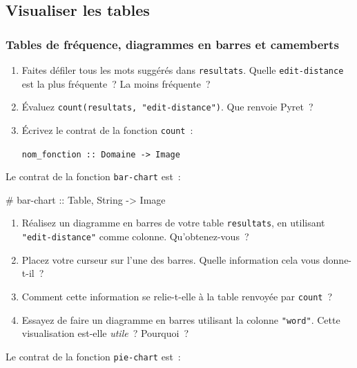 \documentclass[12pt,a4paper]{article}
\newcommand{\contrat}[1]{%
  \begin{contractbox}
    \ttfamily #1
  \end{contractbox}
}
\begin{document}
\subsection{Visualiser les tables}

\subsubsection{Tables de fréquence, diagrammes en barres et camemberts}

\begin{activitybox}
  \begin{enumerate}[leftmargin=*]
    \item Faites défiler tous les mots suggérés dans \texttt{resultats}. Quelle \texttt{edit-distance} est la plus fréquente~? La moins fréquente~?
    \item Évaluez \texttt{count(resultats, "edit-distance")}. Que renvoie Pyret~?
    \item Écrivez le contrat de la fonction \texttt{count}~:
    \begin{center}
      \texttt{nom\_fonction :: Domaine -> Image}
    \end{center}
  \end{enumerate}
\end{activitybox}

Le contrat de la fonction \texttt{bar-chart} est~:

\contrat{\# bar-chart :: Table, String -> Image}

\begin{activitybox}
  \begin{enumerate}[leftmargin=*, resume]
    \item Réalisez un diagramme en barres de votre table \texttt{resultats}, en utilisant \texttt{"edit-distance"} comme colonne. Qu'obtenez-vous~?
    \item Placez votre curseur sur l'une des barres. Quelle information cela vous donne-t-il~?
    \item Comment cette information se relie-t-elle à la table renvoyée par \texttt{count}~?
    \item Essayez de faire un diagramme en barres utilisant la colonne \texttt{"word"}. Cette visualisation est-elle \emph{utile}~? Pourquoi~?
  \end{enumerate}
\end{activitybox}

Le contrat de la fonction \texttt{pie-chart} est~:
\end{document}
